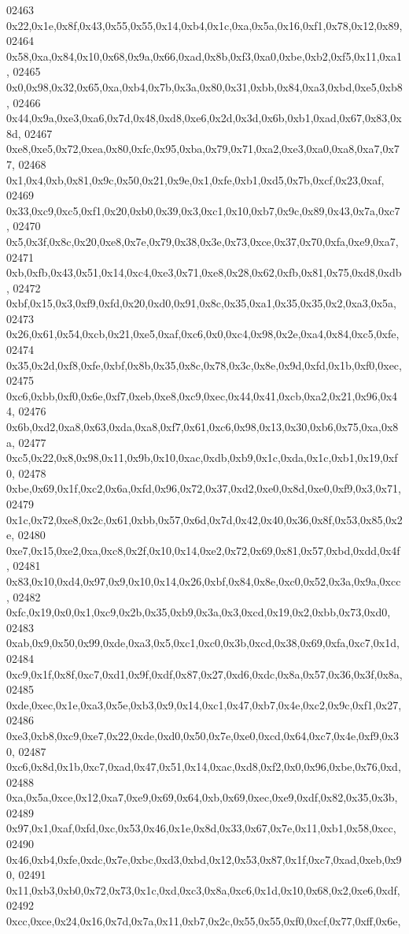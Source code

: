 \begin{DoxyCode}
02463   0x22,0x1e,0x8f,0x43,0x55,0x55,0x14,0xb4,0x1c,0xa,0x5a,0x16,0xf1,0x78,0x12,0x89,
02464   0x58,0xa,0x84,0x10,0x68,0x9a,0x66,0xad,0x8b,0xf3,0xa0,0xbe,0xb2,0xf5,0x11,0xa1,
02465   0x0,0x98,0x32,0x65,0xa,0xb4,0x7b,0x3a,0x80,0x31,0xbb,0x84,0xa3,0xbd,0xe5,0xb8,
02466   0x44,0x9a,0xe3,0xa6,0x7d,0x48,0xd8,0xe6,0x2d,0x3d,0x6b,0xb1,0xad,0x67,0x83,0x8d,
02467   0xe8,0xe5,0x72,0xea,0x80,0xfc,0x95,0xba,0x79,0x71,0xa2,0xe3,0xa0,0xa8,0xa7,0x77,
02468   0x1,0x4,0xb,0x81,0x9c,0x50,0x21,0x9e,0x1,0xfe,0xb1,0xd5,0x7b,0xcf,0x23,0xaf,
02469   0x33,0xc9,0xc5,0xf1,0x20,0xb0,0x39,0x3,0xc1,0x10,0xb7,0x9c,0x89,0x43,0x7a,0xc7,
02470   0x5,0x3f,0x8c,0x20,0xe8,0x7e,0x79,0x38,0x3e,0x73,0xce,0x37,0x70,0xfa,0xe9,0xa7,
02471   0xb,0xfb,0x43,0x51,0x14,0xc4,0xe3,0x71,0xe8,0x28,0x62,0xfb,0x81,0x75,0xd8,0xdb,
02472   0xbf,0x15,0x3,0xf9,0xfd,0x20,0xd0,0x91,0x8c,0x35,0xa1,0x35,0x35,0x2,0xa3,0x5a,
02473   0x26,0x61,0x54,0xcb,0x21,0xe5,0xaf,0xc6,0x0,0xc4,0x98,0x2e,0xa4,0x84,0xc5,0xfe,
02474   0x35,0x2d,0xf8,0xfe,0xbf,0x8b,0x35,0x8c,0x78,0x3c,0x8e,0x9d,0xfd,0x1b,0xf0,0xec,
02475   0xc6,0xbb,0xf0,0x6e,0xf7,0xeb,0xe8,0xc9,0xec,0x44,0x41,0xcb,0xa2,0x21,0x96,0x44,
02476   0x6b,0xd2,0xa8,0x63,0xda,0xa8,0xf7,0x61,0xc6,0x98,0x13,0x30,0xb6,0x75,0xa,0x8a,
02477   0xc5,0x22,0x8,0x98,0x11,0x9b,0x10,0xac,0xdb,0xb9,0x1c,0xda,0x1c,0xb1,0x19,0xf0,
02478   0xbe,0x69,0x1f,0xc2,0x6a,0xfd,0x96,0x72,0x37,0xd2,0xe0,0x8d,0xe0,0xf9,0x3,0x71,
02479   0x1c,0x72,0xe8,0x2c,0x61,0xbb,0x57,0x6d,0x7d,0x42,0x40,0x36,0x8f,0x53,0x85,0x2e,
02480   0xe7,0x15,0xe2,0xa,0xc8,0x2f,0x10,0x14,0xe2,0x72,0x69,0x81,0x57,0xbd,0xdd,0x4f,
02481   0x83,0x10,0xd4,0x97,0x9,0x10,0x14,0x26,0xbf,0x84,0x8e,0xc0,0x52,0x3a,0x9a,0xcc,
02482   0xfc,0x19,0x0,0x1,0xc9,0x2b,0x35,0xb9,0x3a,0x3,0xcd,0x19,0x2,0xbb,0x73,0xd0,
02483   0xab,0x9,0x50,0x99,0xde,0xa3,0x5,0xc1,0xc0,0x3b,0xcd,0x38,0x69,0xfa,0xc7,0x1d,
02484   0xc9,0x1f,0x8f,0xc7,0xd1,0x9f,0xdf,0x87,0x27,0xd6,0xdc,0x8a,0x57,0x36,0x3f,0x8a,
02485   0xde,0xec,0x1e,0xa3,0x5e,0xb3,0x9,0x14,0xc1,0x47,0xb7,0x4e,0xc2,0x9c,0xf1,0x27,
02486   0xe3,0xb8,0xc9,0xe7,0x22,0xde,0xd0,0x50,0x7e,0xe0,0xcd,0x64,0xc7,0x4e,0xf9,0x30,
02487   0xc6,0x8d,0x1b,0xc7,0xad,0x47,0x51,0x14,0xac,0xd8,0xf2,0x0,0x96,0xbe,0x76,0xd,
02488   0xa,0x5a,0xce,0x12,0xa7,0xe9,0x69,0x64,0xb,0x69,0xec,0xe9,0xdf,0x82,0x35,0x3b,
02489   0x97,0x1,0xaf,0xfd,0xc,0x53,0x46,0x1e,0x8d,0x33,0x67,0x7e,0x11,0xb1,0x58,0xcc,
02490   0x46,0xb4,0xfe,0xdc,0x7e,0xbc,0xd3,0xbd,0x12,0x53,0x87,0x1f,0xc7,0xad,0xeb,0x90,
02491   0x11,0xb3,0xb0,0x72,0x73,0x1c,0xd,0xc3,0x8a,0xc6,0x1d,0x10,0x68,0x2,0xe6,0xdf,
02492   0xcc,0xce,0x24,0x16,0x7d,0x7a,0x11,0xb7,0x2c,0x55,0x55,0xf0,0xcf,0x77,0xff,0x6e,

\end{DoxyCode}
